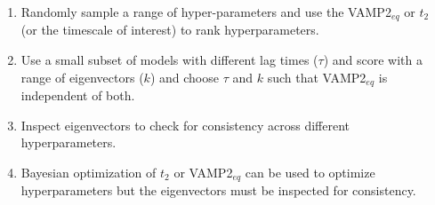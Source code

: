 \documentclass[journal=jacsat,manuscript=article]{achemso}
\begin{document}
\begin{enumerate}
    \item Randomly sample a range of hyper-parameters and use the VAMP2$_{eq}$ or $t_2$ (or the timescale of interest) to rank hyperparameters. 
    \item Use a small subset of models with different lag times ($\tau$) and score with a range of eigenvectors ($k$) and choose $\tau$ and $k$ such that VAMP2$_{eq}$ is independent of both.  
    \item Inspect eigenvectors to check for consistency across different hyperparameters. 
    \item Bayesian optimization of $t_2$ or VAMP2$_{eq}$ can be used to optimize hyperparameters but the eigenvectors must be inspected for consistency.  
\end{enumerate}




\end{document}
